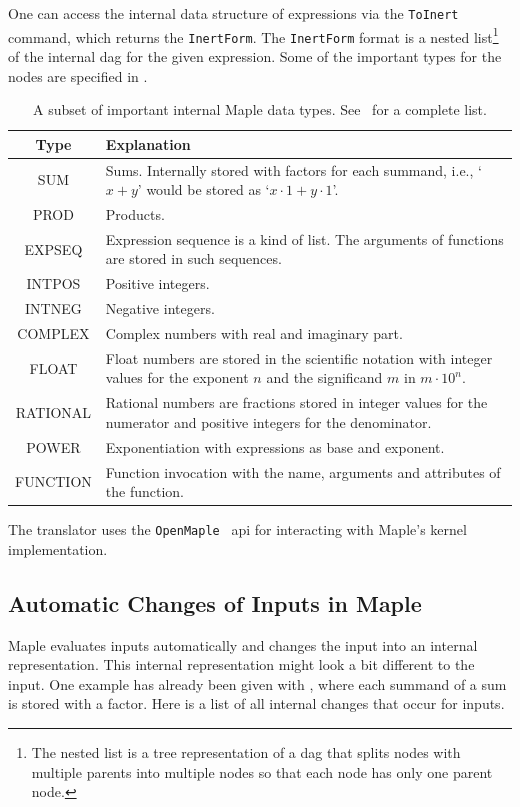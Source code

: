 \documentclass[a4paper,11pt]{article}
\newcommand{\Maple}{Maple}
\newcommand{\inertF}{\texttt{InertForm}}
\theoremstyle{defTheoStyle}
\theoremstyle{defExampStyle}
\begin{document}
One can access the internal data structure of expressions via the \texttt{ToInert} command, which returns the \inertF. The \inertF{} format is a nested list\footnote{The nested list is a tree representation of a \gls*{dag} that splits nodes with multiple parents into multiple nodes so that each node has only one parent node.} of the internal \gls*{dag} for the given expression. Some of the important types for the nodes are specified in .
\begin{table}[ht]
\centering
\begin{tabular}{cp{10cm}}
	\hline
	Type & Explanation\\
	\hline
	SUM & Sums. Internally stored with factors for each summand, i.e., `$x+y$' would be stored as `$x \cdot 1 + y \cdot 1$'.\\
	PROD & Products.\\
	EXPSEQ & Expression sequence is a kind of list. The arguments of functions are stored in such sequences.\\
	INTPOS & Positive integers.\\
	INTNEG & Negative integers.\\
	COMPLEX & Complex numbers with real and imaginary part.\\
	FLOAT & Float numbers are stored in the scientific notation with integer values for the exponent $n$ and the significand $m$ in $m \cdot 10^n$.\\
	RATIONAL & Rational numbers are fractions stored in integer values for the numerator and positive integers for the denominator.\\
	POWER & Exponentiation with expressions as base and exponent.\\
	FUNCTION & Function invocation with the name, arguments and attributes of the function.\\
	\hline
\end{tabular}
\caption{A subset of important internal \Maple{} data types. See~\parencite{MAPLE:ProgrammingGuide} for a complete list.}
\label{tab:maple-types}
\end{table}
The translator uses the \texttt{OpenMaple}~\parencite[\S 14.3]{MAPLE:ProgrammingGuide} \gls*{api} for interacting with \Maple's kernel implementation.

\subsection{Automatic Changes of Inputs in Maple}\label{subsec:maple-probs}
\Maple{} evaluates inputs automatically and changes the input into an internal representation. This internal representation might look a bit different to the input. One example has already been given with , where each summand of a sum is stored with a factor. Here is a list of all internal changes that occur for inputs.
\end{document}
